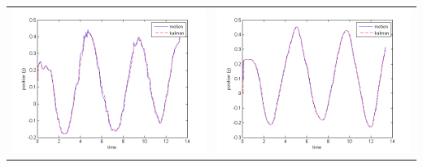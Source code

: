 \documentclass[8pt,sans,mathserif]{beamer}%
\begin{document}
\begin{frame}
\begin{columns}
\begin{tabular}{cc}
            \includegraphics[height = 0.23\textheight, keepaspectratio]{fig/filter0-y.png} & \includegraphics[height = 0.23\textheight, keepaspectratio]{fig/filter3-y.png}\\

\end{tabular}
\end{columns}
\end{frame}
\end{document}
